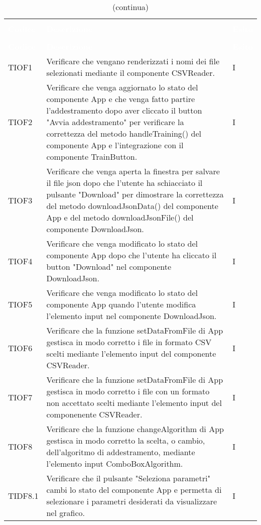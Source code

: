 \begin{longtable}{C{2cm} L{8cm} C{2cm}}
\caption{Tabella dei test di integrazione} \\
\textcolor{white}{\textbf{Codice}} &
\textcolor{white}{\textbf{Descrizione}} &
\textcolor{white}{\textbf{Esito}} \\
		\endfirsthead
		\caption[]{(continua)} \\
\textcolor{white}{\textbf{Codice}} &
\textcolor{white}{\textbf{Descrizione}} &
\textcolor{white}{\textbf{Esito}} \\
		\endhead
TIOF1 & Verificare che vengano renderizzati i nomi dei file selezionati mediante il componente CSVReader. & I \\
TIOF2 & Verificare che venga aggiornato lo stato del componente App e che venga fatto partire l’addestramento dopo aver cliccato il button "Avvia addestramento" per verificare la correttezza del metodo handleTraining() del componente App e l’integrazione con il componente TrainButton. & I \\
TIOF3 & Verificare che venga aperta la finestra per salvare il file json dopo che l’utente ha schiacciato il pulsante "Download" per dimostrare la correttezza del metodo downloadJsonData() del componente App e del metodo downloadJsonFile() del componente DownloadJson. & I \\
TIOF4 & Verificare che venga modificato lo stato del componente App dopo che l’utente ha cliccato il button "Download" nel componente DownloadJson. & I \\
TIOF5 & Verificare che venga modificato lo stato del componente App quando l’utente modifica l’elemento input nel componente DownloadJson. & I \\
TIOF6 & Verificare che la funzione setDataFromFile di App gestisca in modo corretto i file in formato CSV scelti mediante l’elemento input del componente CSVReader. & I \\
TIOF7 & Verificare che la funzione setDataFromFile di App gestisca in modo corretto i file con un formato non accettato scelti mediante l’elemento input del componenente CSVReader. & I \\
TIOF8 & Verificare che la funzione changeAlgorithm di App gestisca in modo corretto la scelta, o cambio, dell'algoritmo di addestramento, mediante l'elemento input ComboBoxAlgorithm. & I \\
TIDF8.1 & Verificare che il pulsante "Seleziona parametri" cambi lo stato del componente App e permetta di selezionare i parametri desiderati da visualizzare nel grafico. & I \\

\end{longtable}
